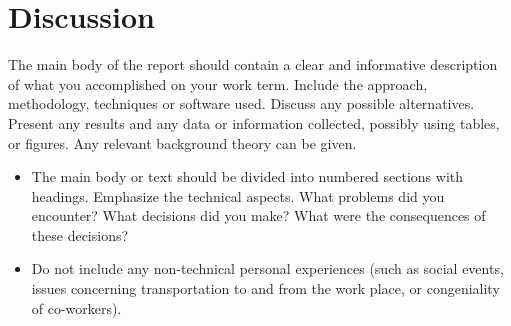 \section{Discussion}

The main body of the report should contain a clear and informative description of what you accomplished on your work term. Include the approach, methodology, techniques or software used. Discuss any possible alternatives. Present any results and any data or information collected, possibly using tables, or figures. Any relevant background theory can be given.

\begin{itemize}
  \item The main body or text should be divided into numbered sections with headings. Emphasize the technical aspects. What problems did you encounter? What decisions did you make? What were the consequences of these decisions?
  \item Do not include any non-technical personal experiences (such as social events, issues concerning transportation to and from the work place, or congeniality of co-workers).
\end{itemize}








